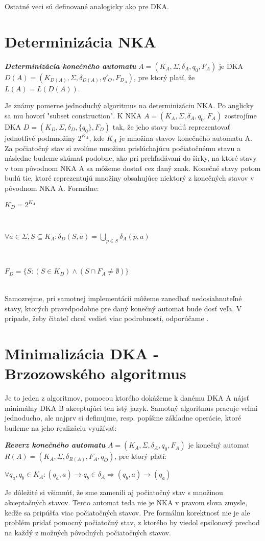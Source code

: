 Ostatné veci sú definované analogicky ako pre DKA.


\section{Determinizácia NKA}

\begin{defn}{\textbf {\textit {Determinizácia konečného automatu}}} $A = (K_A,\Sigma,\delta_A,q_{0},F_A)$ je DKA $D(A) = (K_{D(A)},\Sigma,\delta_{D(A)},q'_{O},F_{D_A})$, pre ktorý platí, že $L(A) = L(D(A))$.
\end{defn}

Je známy pomerne jednoduchý algoritmus na determinizáciu NKA. Po anglicky sa mu hovorí "subset construction". K NKA $A = (K_A,\Sigma,\delta_A,q_0,F_A)$ zostrojíme DKA $D = (K_D,\Sigma,\delta_D,\{q_0\},F_D)$ tak, že jeho stavy budú reprezentovať jednotlivé podmnožiny $2^{K_A}$, kde $K_A$ je množina stavov konečného automatu A. Za počiatočný stav si zvolíme množinu prislúchajúcu počiatočnému stavu a následne budeme skúmať podobne, ako pri prehľadávaní do širky, na ktoré stavy v tom pôvodnom NKA A sa môžeme dostať cez daný znak. Konečné stavy potom budú tie, ktoré reprezentujú množiny obsahujúce niektorý z konečných stavov v pôvodnom NKA A. Formálne: 
\\
\centerline {$K_D = 2^{K_A}$}
\\
\centerline {$\forall a \in \Sigma, S \subseteq K_A: \delta_D(S,a) = {\bigcup}_{p \in S} \delta_A(p,a)$}
\\
\centerline {$F_D = \{S: (S \in K_D) \wedge (S \cap F_A \neq \emptyset)\}$}
\\
Samozrejme, pri samotnej implementácii môžeme zanedbať nedosiahnuteľné stavy, ktorých pravedpodobne pre daný konečný automat bude dosť veľa. V prípade, žeby čitateľ chcel vedieť viac podrobností, odporúčame \cite[Kapitola 2.3.5]{hopcroft}.

\section{Minimalizácia DKA - Brzozowského algoritmus}

Je to jeden z algoritmov, pomocou ktorého dokážeme k danému DKA A nájsť minimálny DKA B akceptujúci ten istý jazyk. Samotný algoritmus pracuje veľmi jednoducho, ale najprv si definujme, resp. popíšme základne operácie, ktoré budeme na jeho realizáciu využívať:

\begin{defn}{\textbf {\textit {Reverz konečného automatu}}} $A=(K_A,\Sigma,\delta_A,q_{0},F_A)$ je konečný automat $R(A)=(K_A,\Sigma,\delta_{R(A)},F_A,q_{O})$, pre ktorý platí:
\\
\centerline{$\forall q_a,q_b \in K_A: (q_a,a) \rightarrow q_b \in \delta_A \Rightarrow (q_b,a)\rightarrow(q_a)$}
\end{defn}
Je dôležité si všimnúť, že sme zamenili aj počiatočný stav s množinou akceptačných stavov. Tento automat teda nie je NKA v pravom slova zmysle, keďže sa pripúšťa viac počiatočných stavov. Pre formálnu korektnosť nie je ale problém pridať pomocný počiatočný stav, z ktorého by viedol epsilonový prechod na každý z možných pôvodných počiatočných stavov.
